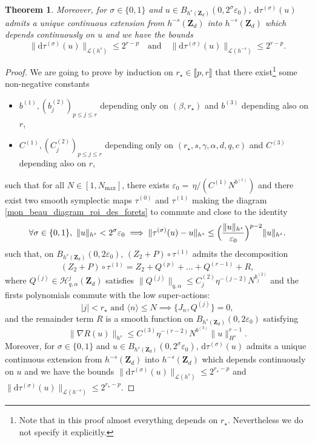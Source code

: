 \documentclass[JEP,XML,SOM,Unicode,NoEqCountersInSection,published]{cedram}
\newtheorem{theorem}{Theorem}[section]
\theoremstyle{definition}
\begin{document}
\begin{theorem}
Moreover, for $\sigma\in \{0,1 \}$ and $u\in B_{h^s(\mathbf{Z}_d)}(0,2^{\sigma}\varepsilon_0)$, $\mathrm{d}\tau^{(\sigma)}(u)$ admits a unique continuous extension from $h^{-s}(\mathbf{Z}_d)$ into $h^{-s}(\mathbf{Z}_d)$ which depends continuously on $u$ and we have the bounds
\[
\|\mathrm{d} \tau^{(\sigma)}(u) \|_{\mathscr{L}(h^{s})} \leq 2^{r-p} \quad \text{and} \quad \|\mathrm{d} \tau^{(\sigma)}(u) \|_{\mathscr{L}(h^{-s})} \leq 2^{r-p}.
\]
\end{theorem}
\begin{proof} We are going to prove by induction on $r_{\star} \in \llbracket p,r \rrbracket$ that there exist\footnote{Note that in this proof almost everything depends on $r_\star$. Nevertheless we do not specify it explicitly.} some non-negative constants
\begin{itemize}
\item $b^{(1)},(b_j^{(2)})_{ p \leq j \leq r}$ depending only on $(\beta,r_\star)$ and $b^{(3)}$ depending also on $r$,
\item $C^{(1)},(C_{j}^{(2)})_{ p \leq j \leq r }$ depending only on $(r_\star,s,\gamma,\alpha,d,q,c)$ and $C^{(3)}$ depending also on $r$,
\end{itemize}
such that for all $N\in [1,N_{\max}]$, there exists $\varepsilon_0 = \, \eta /(C^{(1)} N^{b^{(1)}})$ and there exist two smooth symplectic maps $\tau^{(0)}$ and $\tau^{(1)}$
making the diagram \eqref{mon_beau_diagram_roi_des_forets} to commute and close to the identity
\begin{equation}
\label{eq_close_to_the_id_pres}
\forall \sigma\in \{0,1\}, \ \|u\|_{{h}^s} <2^{\sigma}\varepsilon_0 \implies
\|\tau^{(\sigma)}(u)-u\|_{h^s} \leq \Bigl(\frac{\|u\|_{h^s}}{\varepsilon_0} \Bigr)^{p-2} \|u\|_{h^s}.
\end{equation}
such that, on $ B_{h^s(\mathbf{Z}_d)}(0,2\varepsilon_0)$, $(Z_2+P) \circ \tau^{(1)}$ admits the decomposition
\[
(Z_2+P) \circ \tau^{(1)} = Z_2+ Q^{(p)} + \dots + Q^{(r-1)} + R,
\]
where $Q^{(j)} \in \mathscr{H}_{q,\alpha}^j(\mathbf{Z}_d)$ satisfies $ \| Q^{(j)} \|_{q,\alpha} \leq C_{j}^{(2)} \eta^{-(j-2)} N^{b_j^{(2)}}$ and the firsts polynomials commute with the low super-actions:
\[
|j| < r_{\star} \text{ and } \langle n \rangle\leq N \implies \{ J_n, Q^{(j)} \} = 0,
\]
and the remainder term $R$ is a smooth function on $B_{h^s(\mathbf{Z}_d)}(0,2\varepsilon_0)$ satisfying
\[
\|\nabla R(u)\|_{h^s} \leq C^{(3)} \eta^{-(r-2)} N^{b^{(3)}} \|u\|_{H^s}^{r-1}.
\]
Moreover, for $\sigma\in \{0,1 \}$ and $u\in B_{h^s(\mathbf{Z}_d)}(0,2^{\sigma}\varepsilon_0)$, $\mathrm{d}\tau^{(\sigma)}(u)$ admits a unique continuous extension from $h^{-s}(\mathbf{Z}_d)$ into $h^{-s}(\mathbf{Z}_d)$ which depends continuously on $u$ and we have the bounds
$\|\mathrm{d} \tau^{(\sigma)}(u) \|_{\mathscr{L}(h^{s})} \leq 2^{r_{\star}-p} $ and $\|\mathrm{d} \tau^{(\sigma)}(u) \|_{\mathscr{L}(h^{-s})} \leq 2^{r_{\star}-p}$.


\end{proof}
\end{document}
